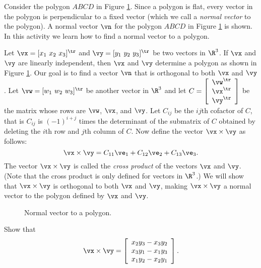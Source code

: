 \begin{pactivity} \label{act:bf_normal} Consider the polygon $ABCD$ in Figure \ref{F:Normal_vector}. Since a polygon is flat, every vector in the polygon is perpendicular to a fixed vector (which we call a \emph{normal vector} to the polygon). A normal vector $\vn$ for the polygon $ABCD$ in Figure \ref{F:Normal_vector} is shown. In this activity we learn how to find a normal vector to a polygon.

Let  $\vx = [x_1 \ x_2 \ x_3]^{\tr}$ and $\vy = [y_1 \ y_2 \ y_3]^{\tr}$ be two vectors in $\R^3$. If $\vx$ and $\vy$ are linearly independent, then $\vx$ and $\vy$ determine a polygon as shown in Figure \ref{F:Normal_vector}. Our goal is to find a vector $\vn$ that is orthogonal to both $\vx$ and $\vy$. Let $\vw = [w_1 \ w_2 \ w_3]^{\tr}$ be another vector in $\R^3$ and let $C = \left[ \begin{array}{c} \vw^{\tr} \\ \vx^{\tr} \\ \vy^{\tr} \end{array} \right]$ be the matrix whose rows are $\vw$, $\vx$, and $\vy$. Let $C_{ij}$ be the $ij$th cofactor of $C$, that is $C_{ij}$ is $(-1)^{i+j}$ times the determinant of the submatrix of $C$ obtained by deleting the $i$th row and $j$th column of $C$.  Now define the vector $\vx \times \vy$ as follows:
\[\vx \times \vy = C_{11}\ve_1 + C_{12}\ve_2 + C_{13} \ve_3.\]
The vector $\vx \times \vy$ is called the \emph{cross product} of the vectors $\vx$ and $\vy$. (Note that the cross product is only defined for vectors in $\R^3$.) We will show that $\vx \times \vy$ is orthogonal to both $\vx$ and $\vy$, making $\vx \times \vy$ a normal vector to the polygon defined by $\vx$ and $\vy$.  
\begin{center}
\begin{figure}[ht] 
\begin{center}
\caption{Normal vector to a polygon.}
\label{F:Normal_vector}
\end{center}
\end{figure}
\end{center}

\ba
\item Show that 
\[\vx \times \vy = \left[ \begin{array}{c} x_2y_3-x_3y_2 \\ x_3y_1-x_1y_3 \\ x_1y_2-x_2y_1 \end{array} \right].\]



\end{pactivity}
